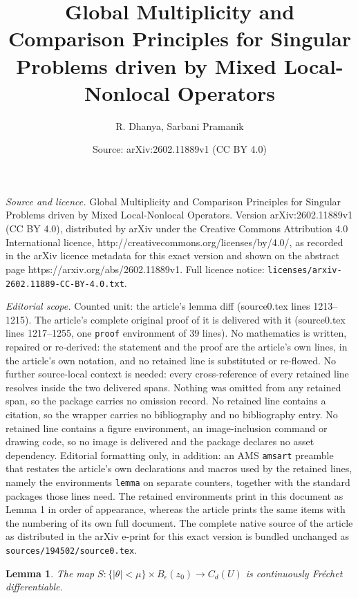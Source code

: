 \documentclass[10pt,a4paper]{amsart}
\title{Global Multiplicity and Comparison Principles for Singular Problems driven by Mixed Local-Nonlocal Operators}
\author{R. Dhanya, Sarbani Pramanik}
\date{Source: arXiv:2602.11889v1 (CC BY 4.0)}
\newtheorem{lemma}{Lemma}
\newcommand{\rar}{\rightarrow}
\begin{document}
\maketitle

\noindent\emph{Source and licence.} Global Multiplicity and Comparison Principles for Singular Problems driven by Mixed Local-Nonlocal Operators. Version arXiv:2602.11889v1 (CC BY 4.0), distributed by arXiv under the Creative Commons Attribution 4.0 International licence, http://creativecommons.org/licenses/by/4.0/, as recorded in the arXiv licence metadata for this exact version and shown on the abstract page https://arxiv.org/abs/2602.11889v1. Full licence notice: \texttt{licenses/arxiv-2602.11889-CC-BY-4.0.txt}.\par\smallskip

\noindent\textit{Editorial scope.} Counted unit: the article's lemma diff (source0.tex lines 1213--1215). The article's complete original proof of it is delivered with it (source0.tex lines 1217--1255, one \texttt{proof} environment of 39 lines). No mathematics is written, repaired or re-derived: the statement and the proof are the article's own lines, in the article's own notation, and no retained line is substituted or re-flowed.  No further source-local context is needed: every cross-reference of every retained line resolves inside the two delivered spans.  Nothing was omitted from any retained span, so the package carries no omission record.  No retained line contains a citation, so the wrapper carries no bibliography and no bibliography entry.  No retained line contains a figure environment, an image-inclusion command or drawing code, so no image is delivered and the package declares no asset dependency.  Editorial formatting only, in addition: an AMS \texttt{amsart} preamble that restates the article's own declarations and macros used by the retained lines, namely the environments \texttt{lemma} on separate counters, together with the standard packages those lines need.  The retained environments print in this document as Lemma 1 in order of appearance, whereas the article prints the same items with the numbering of its own full document.  The complete native source of the article as distributed in the arXiv e-print for this exact version is bundled unchanged as \texttt{sources/194502/source0.tex}.
\begin{lemma}\label{G cont diff}
    The map $S: \{|\theta| < \mu \} \times B_{\epsilon} (z_0) \rar C_d (U)$ is continuously Fr\'echet differentiable.
\end{lemma}
\end{document}
